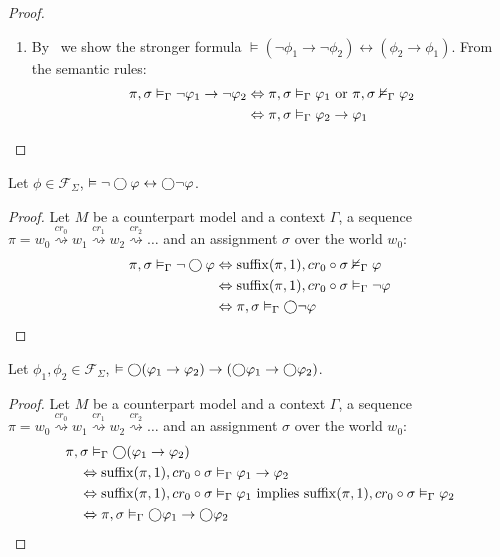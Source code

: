\begin{proof}
\begin{enumerate}
    \item By~ we show the stronger formula $\vDash (\neg\phi_1 \to \neg\phi_2) \leftrightarrow (\phi_2 \to \phi_1)$.
      From the semantic rules:
      \[
        \begin{split}
          {\pi}, {\sigma} \vDash_{\Gamma} {\neg\varphi_1 \to \neg\varphi_2}
            &\Leftrightarrow {\pi}, {\sigma} \vDash_{\Gamma} {\varphi_1} \text{ or } {\pi}, {\sigma} \nvDash_{\Gamma} {\varphi_2} \\
            &\Leftrightarrow {\pi}, {\sigma} \vDash_{\Gamma} {\varphi_2 \to \varphi_1}
        \end{split}
      \]
  \end{enumerate}
\end{proof}

\begin{lemma}\label{lem:negnextdist}
  Let $\phi \in \mathcal{F}_\Sigma$, $\vDash \neg\bigcirc{\varphi} \leftrightarrow \bigcirc{\neg\varphi}$.
\end{lemma}
\begin{proof}
  Let $M$ be a counterpart model and a context $\Gamma$, a sequence $\pi = w_0 \overset{cr_0}{\rightsquigarrow} w_1
  \overset{cr_1}{\rightsquigarrow} w_2 \overset{cr_2}{\rightsquigarrow} \ldots$ and an assignment $\sigma$ over the world $w_0$:
  \[
    \begin{split}
      {\pi}, {\sigma} \vDash_{\Gamma} {\neg\bigcirc{\varphi}}
        &\Leftrightarrow {\operatorname{suffix}(\pi,1)}, {cr_0 \circ \sigma} \nvDash_{\Gamma} {\varphi} \\
        &\Leftrightarrow {\operatorname{suffix}(\pi,1)}, {cr_0 \circ \sigma} \vDash_{\Gamma} {\neg\varphi} \\
        &\Leftrightarrow {\pi}, {\sigma} \vDash_{\Gamma} {\bigcirc{\neg\varphi}}
    \end{split}
  \]
\end{proof}

\begin{lemma}\label{lem:impnextdist}
  Let $\phi_1, \phi_2 \in \mathcal{F}_\Sigma$, $\vDash \bigcirc{(\varphi_1 \to \varphi_2)} \to (\bigcirc{\varphi_1} \to
  \bigcirc{\varphi_2})$.
\end{lemma}
\begin{proof}
  Let $M$ be a counterpart model and a context $\Gamma$, a sequence $\pi = w_0 \overset{cr_0}{\rightsquigarrow} w_1
  \overset{cr_1}{\rightsquigarrow} w_2 \overset{cr_2}{\rightsquigarrow} \ldots$ and an assignment $\sigma$ over the world $w_0$:
  \[
    \begin{split}
      &{\pi}, {\sigma} \vDash_{\Gamma} {\bigcirc{(\varphi_1 \to \varphi_2)}} \\
        &\quad\Leftrightarrow {\operatorname{suffix}(\pi,1)}, {cr_0 \circ \sigma} \vDash_{\Gamma} {\varphi_1 \to \varphi_2} \\
        &\quad\Leftrightarrow {\operatorname{suffix}(\pi,1)}, {cr_0 \circ \sigma} \vDash_{\Gamma} {\varphi_1} \text{ implies }
            {\operatorname{suffix}(\pi,1)}, {cr_0 \circ \sigma} \vDash_{\Gamma} {\varphi_2} \\
        &\quad\Leftrightarrow {\pi}, {\sigma} \vDash_{\Gamma} {\bigcirc{\varphi_1} \to \bigcirc{\varphi_2}}
    \end{split}
  \]
\end{proof}

